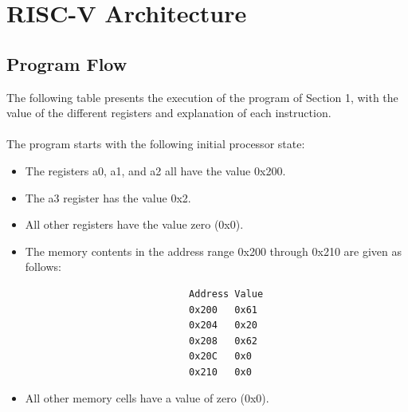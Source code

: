 \documentclass[a4paper,12pt]{article}
\begin{document}
\section{RISC-V Architecture}
\subsection{Program Flow}
The following table presents the execution of the program of Section 1, with the value of the different registers and explanation of each instruction.\\
\\
%
The program starts with the following initial processor state:
\begin{itemize}
    \item The registers a0, a1, and a2 all have the value 0x200.
    \item The a3 register has the value 0x2.
    \item All other registers have the value zero (0x0).
    \item The memory contents in the address range 0x200 through 0x210 are given as follows:
\end{itemize}
\begin{verbatim}
                                Address Value
                                0x200   0x61
                                0x204   0x20
                                0x208   0x62
                                0x20C   0x0
                                0x210   0x0
\end{verbatim}
\begin{itemize}
    \item All other memory cells have a value of zero (0x0).
\end{itemize}
\newpage
\end{document}

